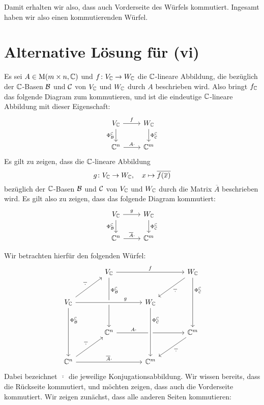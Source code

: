 \documentclass[a4paper,10pt,numbers=noenddot]{scrartcl}
\begin{document}
Damit erhalten wir also, dass auch Vorderseite des Würfels kommutiert.
Ingesamt haben wir also einen kommutierenden Würfel.










\section{Alternative Lösung für (vi)}

Es sei $A \in \operatorname{M}(m \times n, \mathbb{C})$ und $f \colon V_{\mathbb{C}} \to W_{\mathbb{C}}$ die $\mathbb{C}$-lineare Abbildung, die bezüglich der $\mathbb{C}$-Basen $\mathcal{B}$ und $\mathcal{C}$ von $V_{\mathbb{C}}$ und $W_{\mathbb{C}}$ durch $A$ beschrieben wird.
Also bringt $f_{\mathbb{C}}$ das folgende Diagram zum kommutieren, und ist die eindeutige $\mathbb{C}$-lineare Abbildung mit dieser Eigenschaft:
\[
  \begin{tikzcd}
      V_\Cbb
      \arrow[r, "f"]
      \arrow[d, "\Phi^\Cbb_\mc{B}"']
    & W_\Cbb
      \arrow[d, "\Phi^\Cbb_\mc{C}"]
    \\
      \Cbb^n
      \arrow[r, "A \cdot"]
    & \Cbb^m
  \end{tikzcd}
\]
Es gilt zu zeigen, dass die $\mathbb{C}$-lineare Abbildung
\[
  g \colon V_{\mathbb{C}} \to W_{\mathbb{C}},
  \quad
  x \mapsto \overline{f(\overline{x})}
\]
bezüglich der $\mathbb{C}$-Basen $\mathcal{B}$ und $\mathcal{C}$ von $V_{\mathbb{C}}$ und $W_{\mathbb{C}}$ durch die Matrix $\overline{A}$ beschrieben wird.
Es gilt also zu zeigen, dass das folgende Diagram kommutiert:
\[
  \begin{tikzcd}
      V_\Cbb
      \arrow[r, "g"]
      \arrow[d, "\Phi^\Cbb_\mc{B}"']
    & W_\Cbb
      \arrow[d, "\Phi^\Cbb_\mc{C}"]
    \\
      \Cbb^n
      \arrow[r, "\overline{A} \cdot"]
    & \Cbb^m
  \end{tikzcd}
\]

Wir betrachten hierfür den folgenden Würfel:
\[
  \begin{tikzcd}[row sep = large, column sep = large]
      {}
    & V_\Cbb
      \arrow[rr, "f"]
      \arrow[dd, "\Phi^\Cbb_\mc{B}" near start]
    & {}
    & W_\Cbb
      \arrow[dl, "\overline{\,\cdot\,}"]
      \arrow[dd, "\Phi^\Cbb_\mc{C}" near start]
    \\
      V_\Cbb
      \arrow[ur, "\overline{\,\cdot\,}"]
      \arrow[rr, crossing over, "g" near end]
      \arrow[dd, "\Phi^\Cbb_\mc{B}" near start]
    & {}
    & W_\Cbb
    & {}
    \\
      {}
    & \Cbb^n
      \arrow[rr, "A \cdot" near start]
    & {}
    & \Cbb^m
      \arrow[dl, "\overline{\,\cdot\,}"]
    \\
      \Cbb^n
      \arrow[ur, "\overline{\,\cdot\,}"]
      \arrow[rr, "\overline{A} \cdot "]
    & {}
    & \Cbb^m
      \arrow[from=uu, crossing over, "\Phi^\Cbb_\mc{C}" near start]
    & {}
  \end{tikzcd}
\]
Dabei bezeichnet $\overline{\,\cdot\,}$ die jeweilige Konjugationsabbildung.
Wir wissen bereits, dass die Rückseite kommutiert, und möchten zeigen, dass auch die Vorderseite kommutiert.
Wir zeigen zunächst, dass alle anderen Seiten kommutieren:
\end{document}
